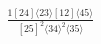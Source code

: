 \documentclass[varwidth, border=5pt]{standalone}
\begin{document}
\begin{my}
$\begin{gathered}
\scriptscriptstyle\frac{1[24]⟨23⟩[12]⟨45⟩}{[25]^2⟨34⟩^2⟨35⟩}
\end{gathered}$
\end{my}
\end{document}
